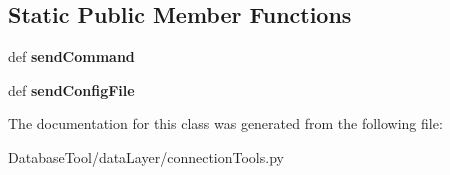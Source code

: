 \subsection*{Static Public Member Functions}
\begin{DoxyCompactItemize}
\item 
\mbox{\label{classMIS_1_1DatabaseTool_1_1dataLayer_1_1connectionTools_1_1linkGBT_abdcae7c74d6d700563252fb342d0d059}} 
def {\bfseries send\+Command}
\item 
\mbox{\label{classMIS_1_1DatabaseTool_1_1dataLayer_1_1connectionTools_1_1linkGBT_af31c03dcb268886a9a122bf6efb3a01b}} 
def {\bfseries send\+Config\+File}
\end{DoxyCompactItemize}


The documentation for this class was generated from the following file\+:\begin{DoxyCompactItemize}
\item 
Database\+Tool/data\+Layer/connection\+Tools.\+py\end{DoxyCompactItemize}
